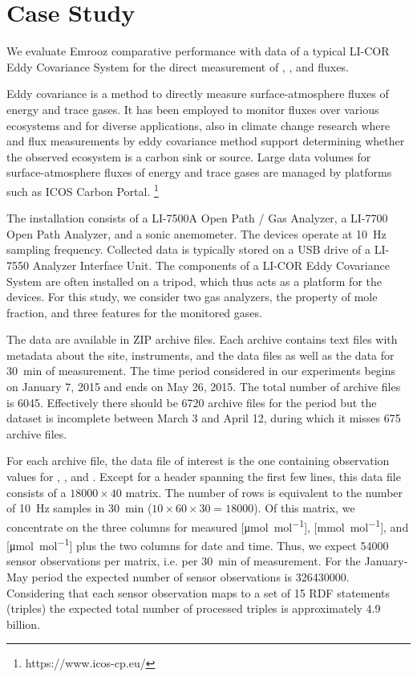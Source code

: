 \documentclass[preprint,12pt,authoryear]{elsarticle}
\begin{document}
\section{Case Study}
\label{s:case-study}
We evaluate Emrooz comparative performance with data of a typical LI-COR Eddy Covariance System for the direct measurement of , , and  fluxes.

Eddy covariance is a method to directly measure surface-atmosphere fluxes of energy and trace gases. It has been employed to monitor fluxes over various ecosystems and for diverse applications, also in climate change research where  and  flux measurements by eddy covariance method support determining whether the observed ecosystem is a carbon sink or source. Large data volumes for surface-atmosphere fluxes of energy and trace gases are managed by platforms such as ICOS Carbon Portal.	\footnote{https://www.icos-cp.eu/}

The installation consists of a LI-7500A Open Path / Gas Analyzer, a LI-7700 Open Path  Analyzer, and a sonic anemometer. The devices operate at \SI{10}{\hertz} sampling frequency. Collected data is typically stored on a USB drive of a LI-7550 Analyzer Interface Unit. The components of a LI-COR Eddy Covariance System are often installed on a tripod, which thus acts as a platform for the devices. For this study, we consider two gas analyzers, the property of mole fraction, and three features for the monitored gases.

The data are available in ZIP archive files. Each archive contains text files with metadata about the site, instruments, and the data files as well as the data for \SI{30}{\minute} of measurement. The time period considered in our experiments begins on January 7, 2015 and ends on May 26, 2015. The total number of archive files is 6045. Effectively there should be 6720 archive files for the period but the dataset is incomplete between March 3 and April 12, during which it misses 675 archive files.

For each archive file, the data file of interest is the one containing observation values for , , and . Except for a header spanning the first few lines, this data file consists of a $\num{18000} \times 40$ matrix. The number of rows is equivalent to the number of \SI{10}{\hertz} samples in \SI{30}{\minute} ($10 \times 60 \times 30 = \num{18000}$). Of this matrix, we concentrate on the three columns for measured  [\si{\micro\mol\per\mol}],  [\si{\milli\mol\per\mol}], and  [\si{\micro\mol\per\mol}] plus the two columns for date and time. Thus, we expect \num{54000} sensor observations per matrix, i.e. per \SI{30}{\minute} of measurement. For the January-May period the expected number of sensor observations is \num{326430000}. Considering that each sensor observation maps to a set of 15 RDF statements (triples) the expected total number of processed triples is approximately 4.9 billion.
\end{document}

